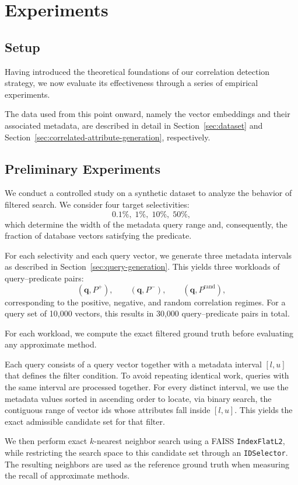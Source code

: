 \chapter{Experiments}\label{chap:experiments}
\section{Setup}
Having introduced the theoretical foundations of our correlation detection strategy, 
we now evaluate its effectiveness through a series of empirical experiments.

The data used from this point onward, namely the vector embeddings and their associated metadata, are described in detail in Section~\ref{sec:dataset} and Section~\ref{sec:correlated-attribute-generation}, respectively.

\section{Preliminary Experiments}
We conduct a controlled study on a synthetic dataset to analyze the behavior of filtered search. 
We consider four target selectivities:
\[
0.1\%,\; 1\%,\; 10\%,\; 50\%,
\]
which determine the width of the metadata query range and, consequently, the fraction of database vectors satisfying the predicate.

For each selectivity and each query vector, we generate three metadata intervals as described in Section~\ref{sec:query-generation}. 
This yields three workloads of query--predicate pairs:
\[
(\mathbf{q}, P^+),\qquad (\mathbf{q}, P^-),\qquad (\mathbf{q}, P^{\mathrm{rand}}),
\]
corresponding to the positive, negative, and random correlation regimes. 
For a query set of 10{,}000 vectors, this results in 30{,}000 query--predicate pairs in total.

For each workload, we compute the exact filtered ground truth before evaluating any approximate method.

Each query consists of a query vector together with a metadata interval \([l,u]\) that defines the filter condition. 
To avoid repeating identical work, queries with the same interval are processed together. 
For every distinct interval, we use the metadata values sorted in ascending order to locate, via binary search, the contiguous range of vector ids whose attributes fall inside \([l,u]\). 
This yields the exact admissible candidate set for that filter.

We then perform exact \(k\)-nearest neighbor search using a FAISS \texttt{IndexFlatL2}, while restricting the search space to this candidate set through an \texttt{IDSelector}. 
The resulting neighbors are used as the reference ground truth when measuring the recall of approximate methods.

